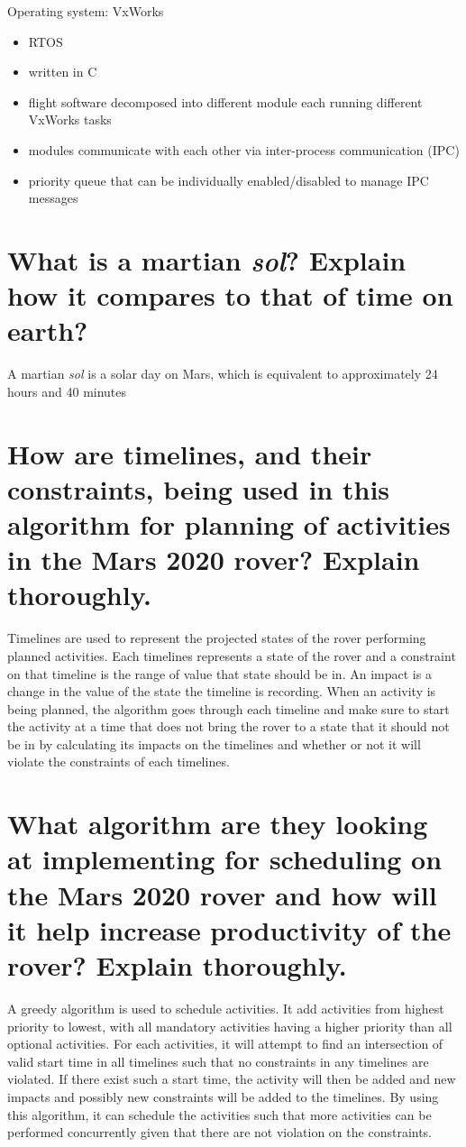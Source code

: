 \documentclass{article}
\begin{document}
Operating system: VxWorks\texttrademark
\begin{itemize}
  \item RTOS
  \item written in C
  \item flight software decomposed into different module each running different VxWorks tasks
  \item modules communicate with each other via inter-process communication (IPC)
  \item priority queue that can be individually enabled/disabled to manage IPC messages
\end{itemize}

\section{What is a martian \textit{sol}?  Explain how it compares to that of time on earth?}
A martian \textit{sol} is a solar day on Mars, which is equivalent to approximately 24 hours and 40 minutes

\section{How are timelines, and their constraints, being used in this algorithm for planning of activities in the Mars 2020 rover?  Explain thoroughly.}
Timelines are used to represent the projected states of the rover performing planned activities.
Each timelines represents a state of the rover and a constraint on that timeline is the range of value that state should be in.
An impact is a change in the value of the state the timeline is recording.
When an activity is being planned, the algorithm goes through each timeline and make sure to start
the activity at a time that does not bring the rover to a state that it should not be in by calculating
its impacts on the timelines and whether or not it will violate the constraints of each timelines.

\section{What algorithm are they looking at implementing for scheduling on the Mars 2020 rover and how will it help increase productivity of the rover?  Explain thoroughly.}
A greedy algorithm is used to schedule activities. It add activities from highest priority to lowest, with all mandatory activities having a higher priority than all optional activities.
For each activities, it will attempt to find an intersection of valid start time in all timelines
such that no constraints in any timelines are violated.
If there exist such a start time, the activity will then be added and new impacts and possibly new constraints will be added to the timelines.
By using this algorithm, it can schedule the activities such that more activities can be performed 
concurrently given that there are not violation on the constraints.
\end{document}
